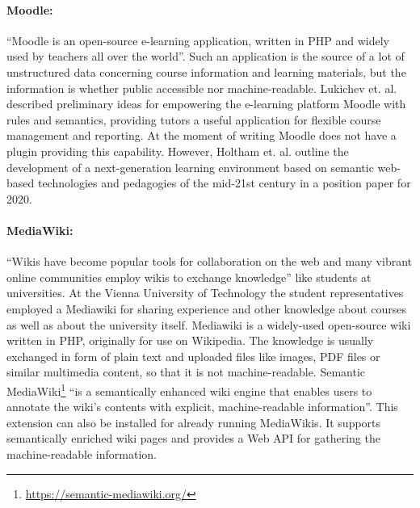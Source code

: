 \documentclass{article}
\begin{document}
\paragraph{Moodle:} \enquote{Moodle is an open-source e-learning application, written in PHP and widely used by teachers all over the world}.\cite{lukichev_empowering_????} Such an application is the source of a lot of unstructured data concerning course information and learning materials, but the information is whether public accessible nor machine-readable. Lukichev et. al. \cite{lukichev_empowering_????} described preliminary ideas for empowering the e-learning platform Moodle with rules and semantics, providing tutors a useful application for flexible course management and reporting. At the moment of writing Moodle does not have a plugin providing this capability. However, Holtham et. al. outline the development of a next-generation learning environment based on semantic web-based technologies and pedagogies of the mid-21st century in a position paper for 2020.\cite{holtham_moodle_2012}

\paragraph{MediaWiki:} \enquote{Wikis have become popular tools for collaboration on the web and many vibrant online communities employ wikis to exchange knowledge} \cite{krotzsch_semantic_2006} like students at universities. At the Vienna University of Technology the student representatives employed a Mediawiki for sharing experience and other knowledge about courses as well as about the university itself. Mediawiki is a widely-used open-source wiki written in PHP, originally for use on Wikipedia. The knowledge is usually exchanged in form of plain text and uploaded files like images, PDF files or similar multimedia content, so that it is not machine-readable. Semantic MediaWiki\footnote{\url{https://semantic-mediawiki.org/}} \enquote{is a semantically enhanced wiki engine that enables users to annotate the wiki’s contents with explicit, machine-readable information}.\cite{krotzsch_semantic_2006} This extension can also be installed for already running MediaWikis. It supports semantically enriched wiki pages and provides a Web API for gathering the machine-readable information. 
\end{document}
